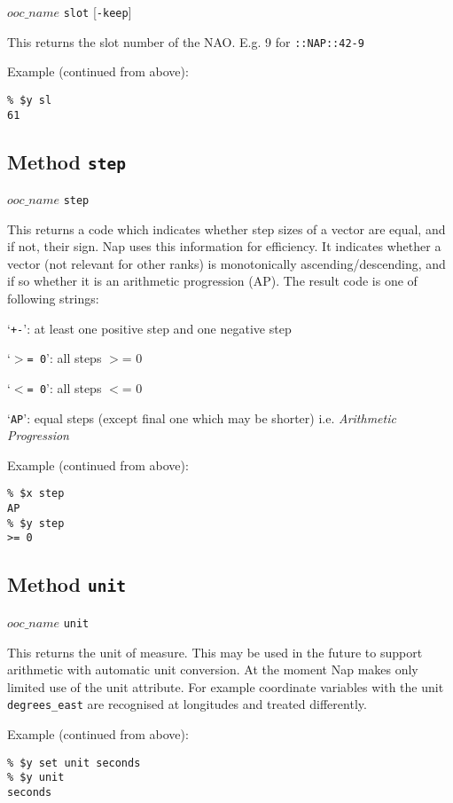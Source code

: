 $ooc\_name$ \texttt{slot} [\texttt{-keep}]

This returns the slot number of the NAO. E.g. 9 for 
  \texttt{::NAP::42-9}

Example (continued from above):
  \begin{verbatim}
% $y sl
61
\end{verbatim}

\subsection{Method \texttt{step}}
    \label{ooc-meta-step}

$ooc\_name$ \texttt{step}

This returns a code which indicates whether step sizes of a vector
  are equal, and if not, their sign. Nap uses this information for
  efficiency. It indicates whether a vector (not relevant for other
  ranks) is monotonically ascending/descending, and if so whether it is
  an arithmetic progression (AP). The result code is one of following
  strings:
\begin{bullets}
    \item `\texttt{+-}': at least one positive step and one negative step
    \item `\texttt{$>$= 0}': all steps $>$= 0
    \item `\texttt{$<$= 0}': all steps $<$= 0
    \item `\texttt{AP}': equal steps (except final one which may be shorter)
	i.e. {\em Arithmetic Progression}
\end{bullets}
  
Example (continued from above):
  \begin{verbatim}
% $x step
AP
% $y step
>= 0
\end{verbatim}

\subsection{Method \texttt{unit}}
    \label{ooc-meta-unit}

  $ooc\_name$ 
  \texttt{unit}

This returns the unit of measure.
This may be used in the future to support arithmetic with automatic unit conversion.
At the moment Nap makes only limited use of the unit attribute.
For example coordinate variables with the unit
\texttt{degrees\_east} are recognised at longitudes and treated differently.

Example (continued from above):
  \begin{verbatim}
% $y set unit seconds
% $y unit
seconds
\end{verbatim}

